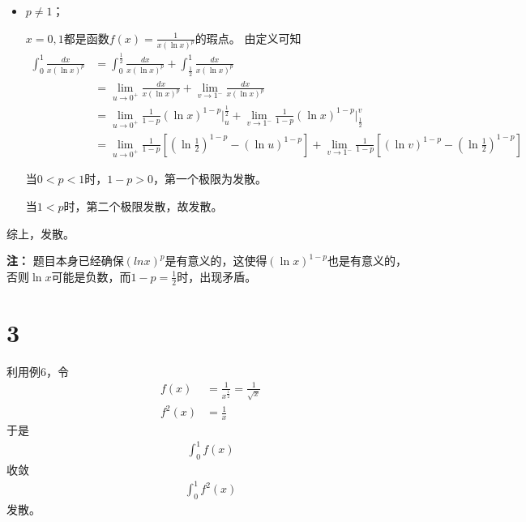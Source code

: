 \documentclass{article}
\begin{document}
\begin{itemize}
\begin{itemize}
          \item $p \neq 1$；

                $x = 0, 1$都是函数$f(x) = \frac{1}{x(\ln x)^p}$的瑕点。
                由定义可知
                \begin{align*}
                  \int_{0}^{1} \frac{dx}{x(\ln x)^p}
                   & = \int_{0}^{\frac{1}{2}} \frac{dx}{x(\ln x)^p} + \int_{\frac{1}{2}}^{1} \frac{dx}{x(\ln x)^p}       \\
                   & = \lim\limits_{u \to 0^{+}} \frac{dx}{x(\ln x)^p} + \lim\limits_{v \to 1^{-}} \frac{dx}{x(\ln x)^p} \\
                   & = \lim\limits_{u \to 0^{+}} \frac{1}{1 - p}(\ln x)^{1-p}\bigg|_{u}^{\frac{1}{2}}
                  + \lim\limits_{v \to 1^{-}} \frac{1}{1 - p}(\ln x)^{1-p}\bigg|_{\frac{1}{2}}^{v}                       \\
                   & = \lim\limits_{u \to 0^{+}} \frac{1}{1 - p}[(\ln \frac{1}{2})^{1-p} - (\ln u)^{1-p}]
                  + \lim\limits_{v \to 1^{-}} \frac{1}{1 - p}[(\ln v)^{1-p} - (\ln \frac{1}{2})^{1-p}]
                \end{align*}

                当$0 < p < 1$时，$1 - p > 0$，第一个极限为发散。

                当$1 < p$时，第二个极限发散，故发散。
        \end{itemize}

        综上，发散。

        \textbf{注：} 题目本身已经确保$(ln x)^p$是有意义的，这使得$(\ln x)^{1-p}$也是有意义的，
        否则$\ln x$可能是负数，而$1 - p = \frac{1}{2}$时，出现矛盾。

\end{itemize}

\section*{3}

利用例6，令
\begin{align*}
  f(x)   & = \frac{1}{x^{\frac{1}{2}}} = \frac{1}{\sqrt{x}} \\
  f^2(x) & = \frac{1}{x}
\end{align*}
于是
\begin{align*}
  \int_{0}^{1} f(x)
\end{align*}
收敛
\begin{align*}
  \int_{0}^{1} f^2(x)
\end{align*}
发散。
\end{document}
